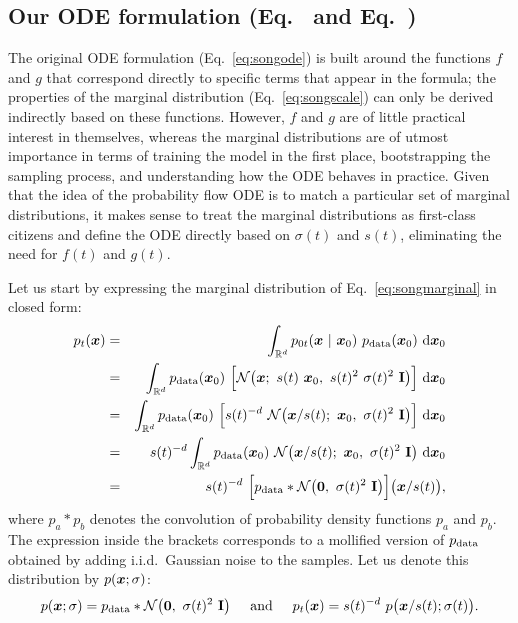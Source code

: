 \subsection{Our ODE formulation (Eq.~ and Eq.~)}
\label{app:ourode}

The original ODE formulation (Eq.~\ref{eq:songode}) is built around the functions $f$ and $g$ that correspond directly to specific terms that appear in the formula; the properties of the marginal distribution (Eq.~\ref{eq:songscale}) can only be derived indirectly based on these functions.
However, $f$ and $g$ are of little practical interest in themselves, whereas the marginal distributions are of utmost importance in terms of training the model in the first place, bootstrapping the sampling process, and understanding how the ODE behaves in practice.
Given that the idea of the probability flow ODE is to match a particular set of marginal distributions, it makes sense to treat the marginal distributions as first-class citizens and define the ODE directly based on $\sigma(t)$ and $s(t)$, eliminating the need for $f(t)$ and $g(t)$.

Let us start by expressing the marginal distribution of Eq.~\ref{eq:songmarginal} in closed form:
\begin{eqnarray}
  p_t(\boldsymbol{x}) &=& \int_{\mathbb{R}^d} p_{0t}(\boldsymbol{x} ~|~ \boldsymbol{x}_0) ~p_\text{data}(\boldsymbol{x}_0) ~\mathrm{d} \boldsymbol{x}_0 \\
  &=& \int_{\mathbb{R}^d} p_\text{data}(\boldsymbol{x}_0) ~\Big[ \mathcal{N} \big( \boldsymbol{x}; ~s(t) ~\boldsymbol{x}_0, ~s(t)^2 ~\sigma(t)^2 ~\mathbf{I} \big) \Big] ~\mathrm{d} \boldsymbol{x}_0 \\
  &=& \int_{\mathbb{R}^d} p_\text{data}(\boldsymbol{x}_0) ~\Big[ s(t)^{-d} ~\mathcal{N} \big( \boldsymbol{x} / s(t); ~\boldsymbol{x}_0, ~\sigma(t)^2 ~\mathbf{I} \big) \Big] ~\mathrm{d} \boldsymbol{x}_0 \\
  &=& s(t)^{-d} \int_{\mathbb{R}^d} p_\text{data}(\boldsymbol{x}_0) ~\mathcal{N} \big( \boldsymbol{x} / s(t); ~\boldsymbol{x}_0, ~\sigma(t)^2 ~\mathbf{I} \big) ~\mathrm{d} \boldsymbol{x}_0 \\
  &=& s(t)^{-d} ~\Big[ p_\text{data} \ast \mathcal{N} \big( \mathbf{0}, ~\sigma(t)^2 ~\mathbf{I} \big) \Big] \big( \boldsymbol{x} / s(t) \big)
  \text{,}
\end{eqnarray}
where $p_a \ast p_b$ denotes the convolution of probability density functions $p_a$ and $p_b$.
The expression inside the brackets corresponds to a mollified version of $p_\text{data}$ obtained by adding i.i.d.\ Gaussian noise to the samples.
Let us denote this distribution by $p(\boldsymbol{x}; \sigma)$:
\begin{equation}
  \label{eq:psigma}
  p(\boldsymbol{x}; \sigma) = p_\text{data} \ast \mathcal{N} \big( \mathbf{0}, ~\sigma(t)^2 ~\mathbf{I} \big)
  \hspace{5mm}\text{and}\hspace{5mm}
  p_t(\boldsymbol{x}) = s(t)^{-d} ~p\big( \boldsymbol{x} / s(t); \sigma(t) \big)
  \text{.}
\end{equation}

